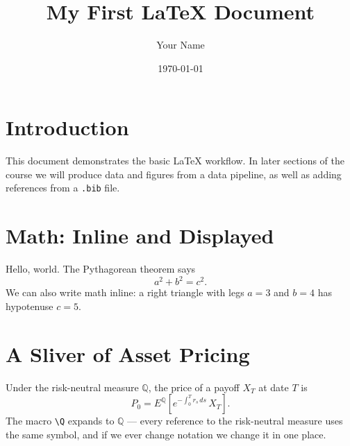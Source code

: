 \documentclass{article}
\title{My First LaTeX Document}
\author{Your Name}
\date{\today}
\newcommand{\Q}{\mathbb{Q}}
\begin{document}
\maketitle

\section{Introduction}
This document demonstrates the basic LaTeX workflow. In later sections of the course we will produce data and figures from a data pipeline, as well as adding references from a \verb|.bib| file.

\section{Math: Inline and Displayed}
Hello, world. The Pythagorean theorem says
\begin{equation}
  a^2 + b^2 = c^2.
\end{equation}
We can also write math inline: a right triangle with legs $a = 3$ and $b = 4$ has hypotenuse $c = 5$.

\section{A Sliver of Asset Pricing}
Under the risk-neutral measure $\Q$, the price of a payoff $X_T$ at date $T$ is
\begin{equation}
  P_0 = E^{\Q}\left[ e^{-\int_0^T r_s\,ds} \, X_T \right].
\end{equation}
The macro \verb|\Q| expands to $\Q$ --- every reference to the risk-neutral measure uses the same symbol, and if we ever change notation we change it in one place.
\end{document}
